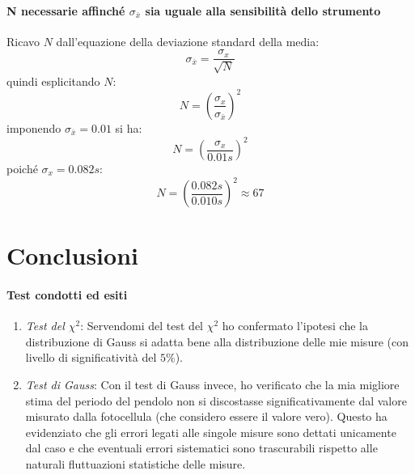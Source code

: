 \documentclass{article}
\begin{document}
	\noindent
	\paragraph{N necessarie affinché $\sigma_{\bar{x}}$ sia uguale alla sensibilità dello strumento}
	Ricavo $N$ dall'equazione della deviazione standard della media:
	\[
	\sigma_{\bar{x}} = \frac{\sigma_{x}}{\sqrt{N}} 
	\]
	quindi esplicitando $N$:
	\[
	N = \left(\frac{\sigma_x}{\sigma_{\bar{x}}}\right)^2
	\]
	imponendo $\sigma_{\bar{x}} = 0.01$ si ha:
	\[
	N = \left(\frac{\sigma_x}{0.01s}\right)^2
	\]
	poiché $\sigma_x = 0.082s$:
	\[
	N = \left(\frac{0.082s}{0.010s}\right)^2 \approx 67
	\]
	
	
	

	\vspace{1.8cm}
	\section{Conclusioni}
	\paragraph{Test condotti ed esiti}
	\begin{enumerate}
		\item \textit{Test del $\chi^2$}: Servendomi del test del $\chi^2$ ho confermato l'ipotesi che la distribuzione di Gauss si adatta bene alla distribuzione delle mie misure (con livello di significatività del $5\%$). 
		\item \textit{Test di Gauss}: Con il test di Gauss invece, ho verificato che la mia migliore stima del periodo del pendolo non si discostasse significativamente dal valore misurato dalla fotocellula (che considero essere il valore vero). Questo ha evidenziato che gli errori legati alle singole misure sono dettati unicamente dal caso e che eventuali errori sistematici sono trascurabili rispetto alle naturali fluttuazioni statistiche delle misure.
	\end{enumerate}
	
\end{document}
